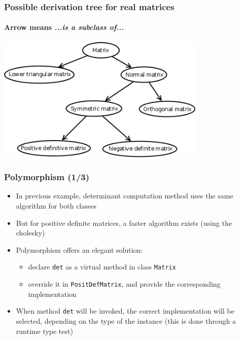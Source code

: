 \documentclass{beamer}
\begin{document}
\begin{frame}
  \frametitle{Possible derivation tree for real matrices}
  \framesubtitle{Arrow means \textit{...is a subclass of...}}
  \begin{center}
    \includegraphics[width=10cm]{matrices.png}
  \end{center}
\end{frame}

\begin{frame}
  \frametitle{Polymorphism (1/3)}
  \begin{itemize}
  \item In previous example, determinant computation method uses the same algorithm for both classes
  \item But for positive definite matrices, a faster algorithm exists (using the cholesky)
  \item \alert{Polymorphism} offers an elegant solution:
    \begin{itemize}
    \item declare \texttt{det} as a \alert{virtual method} in class \texttt{Matrix}
    \item \alert{override} it in \texttt{PositDefMatrix}, and provide the corresponding implementation
    \end{itemize}
  \item When method \texttt{det} will be invoked, the correct implementation will be selected, depending on the type of the instance (this is done through a runtime type test)
  \end{itemize}
\end{frame}
\end{document}
